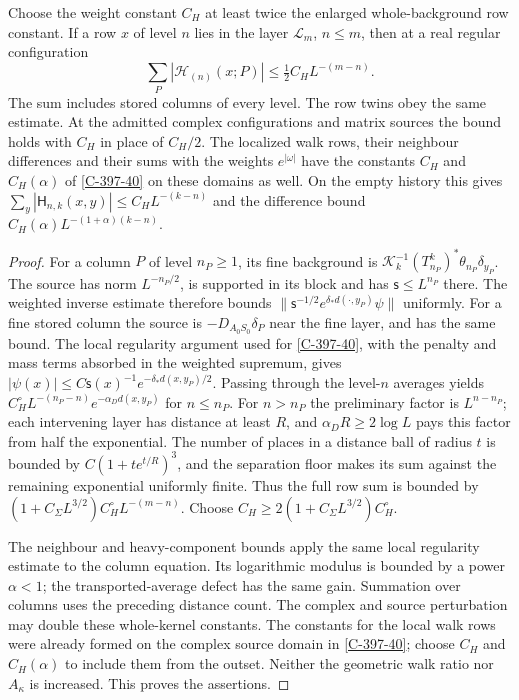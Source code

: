 \documentclass[11pt,letterpaper,reqno]{amsart}
\makeatletter
\theoremstyle{definition}
\newcommand{\ms@minorstart}{%
  \pushQED{\qed}\renewcommand{\qedsymbol}{$\blacksquare$}}
\newenvironment{lemma}[1][]{\ms@minorstart\ms@lemma[#1]}
  {\popQED\endms@lemma}
\theoremstyle{remark}
\makeatother
\begin{document}
\begin{lemma}[Rows reaching stored layers]\label{C-397-33}
Choose the weight constant $C_H$ at least twice the enlarged
whole-background row constant.  If a row $x$ of level $n$
lies in the layer $\mathcal L_m$, $n\le m$, then at a real
regular configuration
\[
 \sum_P|\mathcal H_{(n)}(x;P)|
            \le\tfrac12 C_HL^{-(m-n)}.
\]
The sum includes stored columns of every level.  The row
twins obey the same estimate.  At the admitted complex
configurations and matrix sources the bound holds with
$C_H$ in place of $C_H/2$.  The localized walk rows,
their neighbour differences and their sums with the
weights $e^{|\omega|}$ have the constants $C_H$ and
$C_H(\alpha)$ of \cref{C-397-40} on these domains as
well.  On the empty history this gives
$\sum_y|\mathsf H_{n,k}(x,y)|\le C_HL^{-(k-n)}$ and
the difference bound $C_H(\alpha)L^{-(1+\alpha)(k-n)}$.
\end{lemma}
\begin{proof}
For a column $P$ of level $n_P\ge1$, its fine background
is $\mathcal K_k^{-1}(T^k_{n_P})^*\theta_{n_P}\delta_{y_P}$.
The source has norm $L^{-n_P/2}$, is supported in its
block and has $\mathsf s\le L^{n_P}$ there.  The weighted
inverse estimate therefore bounds
$\|\mathsf s^{-1/2}e^{\delta_*d(\cdot,y_P)}\psi\|$
uniformly.  For a fine stored column the source is
$-D_{A_0S_0}\delta_P$ near the fine layer, and has the
same bound.  The local regularity argument used for
\cref{C-397-40}, with the penalty and mass terms
absorbed in the weighted supremum, gives
$|\psi(x)|\le C\mathsf s(x)^{-1}e^{-\delta_*d(x,y_P)/2}$.
Passing through the level-$n$ averages yields
$C_H^\circ L^{-(n_P-n)}e^{-\alpha_Dd(x,y_P)}$ for
$n\le n_P$.  For $n>n_P$ the preliminary factor is
$L^{n-n_P}$; each intervening layer has distance at
least $R$, and $\alpha_DR\ge2\log L$ pays this factor
from half the exponential.  The number of places in
a distance ball of radius $t$ is bounded by
$C(1+te^{t/R})^3$, and the separation floor makes its
sum against the remaining exponential uniformly finite.
Thus the full row sum is bounded by
$(1+C_\Sigma L^{3/2})C_H^\circ L^{-(m-n)}$.
Choose $C_H\ge2(1+C_\Sigma L^{3/2})C_H^\circ$.

The neighbour and heavy-component bounds apply the
same local regularity estimate to the column equation.
Its logarithmic modulus is bounded by a power
$\alpha<1$; the transported-average defect has the
same gain.  Summation over columns uses the preceding
distance count.  The complex and source perturbation
may double these whole-kernel constants.  The constants
for the local walk rows were already formed on the
complex source domain in \cref{C-397-40}; choose $C_H$
and $C_H(\alpha)$ to include them from the outset.
Neither the geometric walk ratio nor $A_\kappa$ is
increased.  This proves the assertions.
\end{proof}
\end{document}
